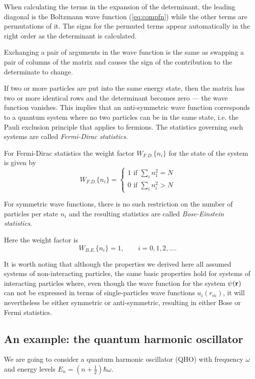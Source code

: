 \documentclass{article}
\begin{document}
When calculating the terms in the expansion of the determinant, the leading diagonal is the Boltzmann wave function (\ref{eq:compfn}) while the other terms are permutations of it. The signs for the permuted terms appear automatically in the right order as the determinant is calculated.

Exchanging a pair of arguments in the wave function is the same as swapping a pair of columns of the matrix and causes the sign of the contribution to the determinate to change.

If two or more particles are put into the same energy state, then the matrix has two or more identical rows and the determinant becomes zero --- the wave function vanishes. This implies that an anti-symmetric wave function corresponds to a quantum system where no two particles can be in the same state, i.e. the Pauli exclusion principle that applies to fermions. The statistics governing such systems are called \emph{Fermi-Dirac statistics}.

For Fermi-Dirac statistics the weight factor $W_{F.D.}\{n_i\}$ for the state of the system is given by
$$
	W_{F.D.}\{n_i\} = 
	\begin{cases}
		1 \text{ if } \sum_i n_1^2 = N\\
		0 \text{ if } \sum_i n_i^2 > N
	\end{cases}
$$


For symmetric wave functions, there is no such restriction on the number of particles per state $n_i$ and the resulting statistics are called \emph{Bose-Einstein statistics}.

Here the weight factor is
$$
	W_{B.E.}\{n_i\} = 1,\qquad i=0,1,2,\ldots.
$$

It is worth noting that although the properties we derived here all assumed systems of non-interacting particles, the same basic properties hold for systems of interacting particles where, even though the wave function for the system $\psi({\bf r})$ can not be expressed in terms of single-particles wave functions $u_i(r_m)$, it will nevertheless be either symmetric or anti-symmetric, resulting in either Bose or Fermi statistics.

\subsection*{An example: the quantum harmonic oscillator}
We are going to consider a quantum harmonic oscillator (QHO) with frequency $\omega$ and energy levels $E_n = (n+\frac12)\hbar\omega$.
\end{document}
